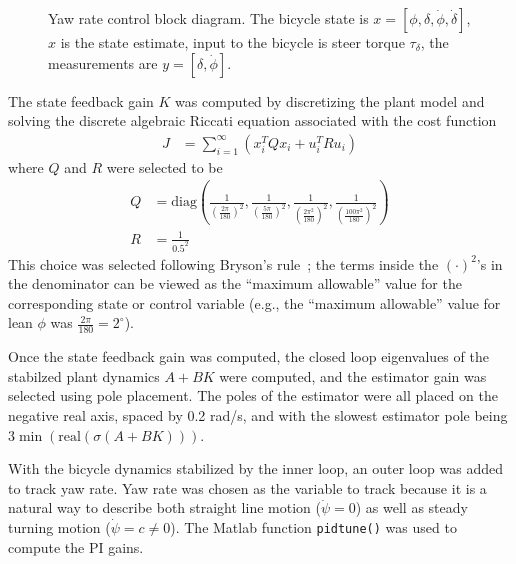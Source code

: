 \begin{figure}[h]
  \caption{Yaw rate control block diagram. The bicycle state is $x=[\phi,
  \delta, \dot{\phi}, \dot{\delta}]$, $\hat{x}$ is the state estimate, input to
  the bicycle is steer torque $\tau_\delta$, the measurements are $y =
  [\delta, \dot{\phi}]$.}
  \label{rb:fig:yr_block_diagram}
\end{figure}
The state feedback gain $K$ was computed by discretizing the plant model and
solving the discrete algebraic Riccati equation associated with the cost
function
\begin{align}
  J &= \sum_{i=1}^{\infty} (x_i^T Q x_i + u_i^T R u_i)
\end{align}
where $Q$ and $R$ were selected to be
\begin{align}
  Q &= \text{diag}(\frac{1}{(\frac{2\pi}{180})^{2}},
                   \frac{1}{(\frac{5\pi}{180})^{2}},
                   \frac{1}{(\frac{2\pi^2}{180})^{2}},
                   \frac{1}{(\frac{100\pi^2}{180})^{2}}) \\
  R &= \frac{1}{0.5^2}
\end{align}
This choice was selected following Bryson's rule~\cite{Bryson1975}; the terms
inside the $(\cdot)^2$'s in the denominator can be viewed as the ``maximum
allowable'' value for the corresponding state or control variable (e.g., the
``maximum allowable'' value for lean $\phi$ was $\frac{2\pi}{180}=2^{\circ}$).

Once the state feedback gain was computed, the closed loop eigenvalues of the
stabilzed plant dynamics $A+BK$ were computed, and the estimator gain was
selected using pole placement. The poles of the estimator were all placed on
the negative real axis, spaced by 0.2 rad/s, and with the slowest estimator
pole being $3\min(\text{real}(\sigma(A+BK)))$.

With the bicycle dynamics stabilized by the inner loop, an outer loop was added
to track yaw rate. Yaw rate was chosen as the variable to track because it is a
natural way to describe both straight line motion ($\dot{\psi}=0$) as well as
steady turning motion ($\dot{\psi}=c\ne0$). The Matlab function
\verb|pidtune()| was used to compute the PI gains.

